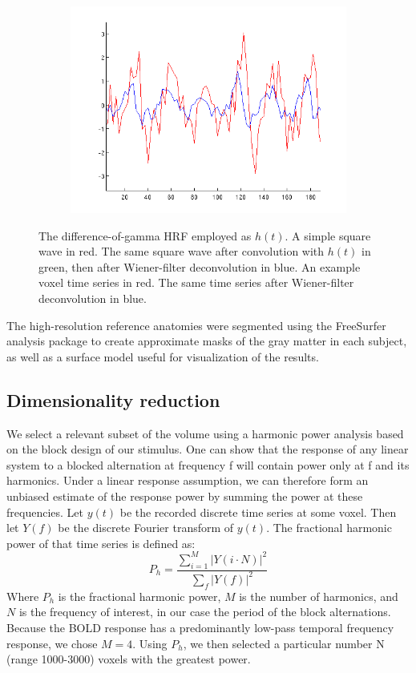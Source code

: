 \documentclass[preprint,5p,authoryear]{elsarticle}
\begin{document}
\begin{figure}
\begin{subfigure}{0.4\textwidth}
\includegraphics[width=\textwidth]{figures/wiener-voxel}
\caption{}
\label{fig:wiener-voxel}
\end{subfigure}
\caption{
 The difference-of-gamma HRF employed as $h(t)$. 
 A simple square wave in red. 
The same square wave after convolution with $h(t)$ in green, then after Wiener-filter deconvolution in blue. 
 An example voxel time series in red. 
The same time series after Wiener-filter deconvolution in blue.}
\label{fig:wiener-deconvolution}
\end{figure}

The high-resolution reference anatomies were segmented using the FreeSurfer analysis package \citep{FreeSurfer} to create approximate masks of the gray matter in each subject, as well as a surface model useful for visualization of the results.

\subsection{Dimensionality reduction}
We select a relevant subset of the volume using a harmonic power analysis based on the block design of our stimulus. 
One can show that the response of any linear system to a blocked alternation at frequency f will contain power only at f and its harmonics. 
Under a linear response assumption, we can therefore form an unbiased estimate of the response power by summing the power at these frequencies. 
Let $y(t)$ be the recorded discrete time series at some voxel.
Then let $Y(f)$ be the discrete Fourier transform of $y(t)$.
The fractional harmonic power of that time series is defined as:
\begin{equation}
P_h = \frac{\sum_{i = 1}^{M}{\left|Y(i \cdot N)\right|^{2}}}{\sum_{f}{\left|Y(f)\right|^{2}}}
\end{equation}
Where $P_h$ is the fractional harmonic power, $M$ is the number of harmonics, and $N$ is the frequency of interest, in our case the period of the block alternations. 
Because the BOLD response has a predominantly low-pass temporal frequency response, we chose $M = 4$. 
Using $P_h$, we then selected a particular number N (range 1000-3000) voxels with the greatest power. 
\end{document}
